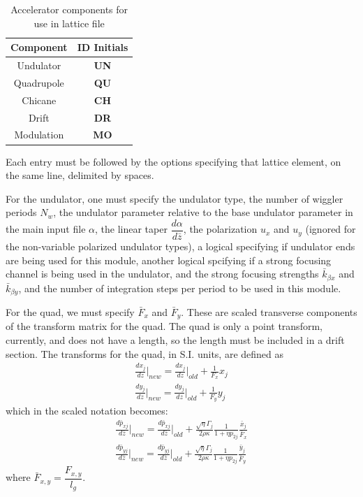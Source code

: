 \documentclass[12pt]{article}%
\begin{document}
\begin{table}
\centering
\caption[Input in Lattice File]{Accelerator components for use in lattice file}
\begin{tabular}{|  c   | c  |}
\hline
Component & ID Initials  \\
\hline
Undulator & {\bf UN} \\
\hline
Quadrupole & {\bf QU} \\
\hline
Chicane & {\bf CH} \\
\hline
Drift & {\bf DR} \\
\hline
Modulation & {\bf MO} \\
\hline
\end{tabular}
\label{tableLat}
\vspace*{-\baselineskip}
\end{table}









Each entry must be followed by the options specifying that lattice element, on the same line, delimited by spaces.

For the undulator,  one must specify the undulator type, the number of wiggler periods $N_w$, the undulator parameter relative to the base undulator parameter in the main input file $\alpha$, the linear taper $\dfrac{d \alpha}{d \bar{z}}$, the polarization $u_x$ and $u_y$ (ignored for the non-variable polarized undulator types), a logical specifying if undulator ends are being used for this module, another logical spcifying if a strong focusing channel is being used in the undulator, and the strong focusing strengths $\bar{k}_{\beta x}$ and $\bar{k}_{\beta y}$, and the number of integration steps per period to be used in this module.

For the quad, we must specify $\bar{F}_x$ and $\bar{F}_y$. These are scaled transverse components of the transform matrix for the quad. The quad is only a point transform, currently, and does not have a length, so the length must be included in a drift section. The transforms for the quad, in S.I. units, are defined as
\begin{align}
\frac{d x_j}{d z}  \bigg|_{new} = \frac{d x_j}{d z} \bigg|_{old} + \frac{1}{F_x} x_j \\
\frac{d y_j}{d z}  \bigg|_{new} = \frac{d y_j}{d z} \bigg|_{old} + \frac{1}{F_y} y_j
\end{align}
which in the scaled notation becomes:
\begin{align}
\frac{d \bar{p}_{xj}}{d \bar{z}} \bigg|_{new} = \frac{d \bar{p}_{xj}}{d \bar{z}}  \bigg|_{old} +\frac{\sqrt{\eta}\Gamma_j}{2\rho\kappa} \frac{1}{1+\eta p_{2j}}  \frac{\bar{x}_j}{\bar{F}_x} \\
\frac{d \bar{p}_{yj}}{d \bar{z}}  \bigg|_{new} = \frac{d \bar{p}_{yj}}{d \bar{z}}  \bigg|_{old} +\frac{\sqrt{\eta}\Gamma_j}{2\rho\kappa} \frac{1}{1+\eta p_{2j}}  \frac{\bar{y}_j}{\bar{F}_y}
\end{align}
where $\bar{F}_{x,y} = \dfrac{F_{x,y}}{l_g}$.
\end{document}
